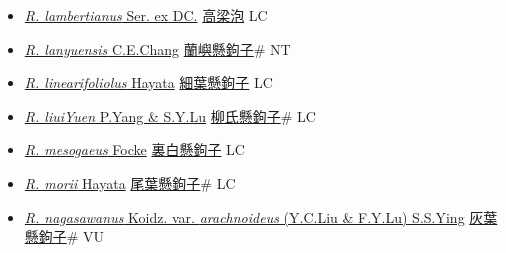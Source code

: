\begin{itemize}
\begin{itemize}
        \item[] \href{http://www.theplantlist.org/tpl1.1/search?q=Rubus+lambertianus}{\textit{R. lambertianus} Ser. ex DC.}   \href{\detokenize{http://taibnet.sinica.edu.tw/chi/taibnet_species_list.php?T2=高梁泡&T2_new_value=true&fr=y}}{高梁泡} LC
        \item[] \href{http://www.theplantlist.org/tpl1.1/search?q=Rubus+lanyuensis}{\textit{R. lanyuensis} C.E.Chang}   \href{\detokenize{http://taibnet.sinica.edu.tw/chi/taibnet_species_list.php?T2=蘭嶼懸鉤子&T2_new_value=true&fr=y}}{蘭嶼懸鉤子}\# NT
        \item[] \href{http://www.theplantlist.org/tpl1.1/search?q=Rubus+linearifoliolus}{\textit{R. linearifoliolus} Hayata}   \href{\detokenize{http://taibnet.sinica.edu.tw/chi/taibnet_species_list.php?T2=細葉懸鉤子&T2_new_value=true&fr=y}}{細葉懸鉤子} LC
        \item[] \href{http://www.theplantlist.org/tpl1.1/search?q=Rubus+liuiYuen}{\textit{R. liuiYuen} P.Yang \& S.Y.Lu}   \href{\detokenize{http://taibnet.sinica.edu.tw/chi/taibnet_species_list.php?T2=柳氏懸鉤子&T2_new_value=true&fr=y}}{柳氏懸鉤子}\# LC
        \item[] \href{http://www.theplantlist.org/tpl1.1/search?q=Rubus+mesogaeus}{\textit{R. mesogaeus} Focke}   \href{\detokenize{http://taibnet.sinica.edu.tw/chi/taibnet_species_list.php?T2=裏白懸鉤子&T2_new_value=true&fr=y}}{裏白懸鉤子} LC
        \item[] \href{http://www.theplantlist.org/tpl1.1/search?q=Rubus+morii}{\textit{R. morii} Hayata}   \href{\detokenize{http://taibnet.sinica.edu.tw/chi/taibnet_species_list.php?T2=尾葉懸鉤子&T2_new_value=true&fr=y}}{尾葉懸鉤子}\# LC
        \item[] \href{http://www.theplantlist.org/tpl1.1/search?q=Rubus+nagasawanus+var.+arachnoideus}{\textit{R. nagasawanus} Koidz. var. \textit{arachnoideus} (Y.C.Liu \& F.Y.Lu) S.S.Ying}     \href{\detokenize{http://taibnet.sinica.edu.tw/chi/taibnet_species_list.php?T2=灰葉懸鉤子&T2_new_value=true&fr=y}}{灰葉懸鉤子}\# VU

\end{itemize}
\end{itemize}
